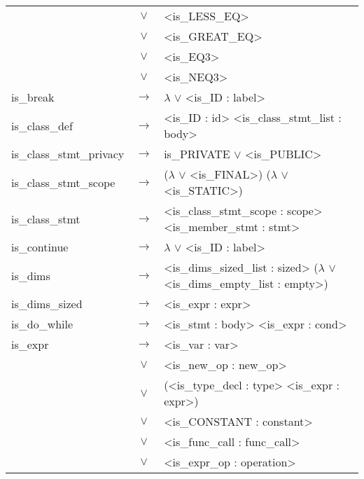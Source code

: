 \documentclass[a4paper]{article}
\begin{document}
\begin{longtable}{lcl}
								& $\vee$ & <is\_LESS\_EQ> \\
								& $\vee$ & <is\_GREAT\_EQ> \\
								& $\vee$ & <is\_EQ3> \\
								& $\vee$ & <is\_NEQ3> \\
	is\_break 					& $\to$ & $\lambda$ $\vee$ <is\_ID : label> \\
	is\_class\_def				& $\to$ & <is\_ID : id> <is\_class\_stmt\_list : body> \\
	is\_class\_stmt\_privacy	& $\to$ & is\_PRIVATE $\vee$ <is\_PUBLIC>\\	
	is\_class\_stmt\_scope		& $\to$ &($\lambda$ $\vee$ <is\_FINAL>) ($\lambda$ $\vee$ <is\_STATIC>) \\
	is\_class\_stmt 			& $\to$ & <is\_class\_stmt\_scope : scope> <is\_member\_stmt : stmt> \\
	is\_continue				& $\to$ & $\lambda$ $\vee$ <is\_ID : label> \\
	is\_dims					& $\to$ & <is\_dims\_sized\_list : sized> ($\lambda$ $\vee$ <is\_dims\_empty\_list : empty>) \\
	is\_dims\_sized				& $\to$ & <is\_expr : expr> \\
	is\_do\_while				& $\to$ & <is\_stmt : body> <is\_expr : cond> \\
	is\_expr					& $\to$ & <is\_var : var> \\
								& $\vee$ & <is\_new\_op : new\_op> \\
								& $\vee$ & (<is\_type\_decl : type> <is\_expr : expr>) \\
								& $\vee$ & <is\_CONSTANT : constant> \\
								& $\vee$ & <is\_func\_call : func\_call> \\
								& $\vee$ & <is\_expr\_op : operation> \\


\end{longtable}
\end{document}
